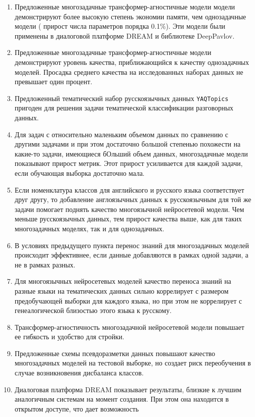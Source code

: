 {}
\begin{enumerate}
\item Предложенные многозадачные трансформер-агностичные модели модели демонстрируют более высокую степень экономии памяти, чем однозадачные модели ( прирост числа параметров порядка 0.1\%). Эти модели были применены в диалоговой платформе DREAM и библиотеке DeepPavlov.
\item Предложенные многозадачные трансформер-агностичные модели демонстрируют уровень качества, приближающийся к качеству однозадачных моделей. Просадка среднего качества на исследованных наборах данных не превышает один процент.
\item Предложенный тематический набор русскоязычных данных \texttt{YAQTopics} пригоден для решения задачи тематической классификации разговорных данных.
\item Для задач с относительно маленьким объемом данных по сравнению с другими задачами и при этом достаточно большой степенью похожести на какие-то задачи, имеющиеся бОльший объем данных, многозадачные модели показывают прирост метрик. Этот прирост усиливается для каждой задачи, если обучающая выборка достаточно мала.
\item Если номенклатура классов для английского и русского языка соответствует друг другу, то добавление англоязычных данных к русскоязычным для той же задачи помогает поднять качество многоязычной нейросетевой модели. Чем меньше русскоязычных данных, тем прирост качества выше, как для таких многозадачных моделях, так и для однозадачных.
\item В условиях предыдущего пункта перенос знаний для многозадачных моделей происходит эффективнее, если данные добавляются в рамках одной задачи, а не в рамках разных.
\item Для многоязычных нейросетевых моделей качество переноса знаний на разные языки на тематических данных сильно коррелирует с размером предобучающей выборки для каждого языка, но при этом не коррелирует с генеалогической близостью этого языка к русскому.
\item Трансформер-агностичность многозадачной нейросетевой модели повышает ее гибкость и удобство для стройки.
\item Предложенные схемы псевдоразметки данных повышают качество многозадачных моделей на тестовой выборке, но создает риск переобучения в случае возникновения дисбаланса классов.

\item Диалоговая платформа DREAM показывает результаты, близкие к лучшим аналогичным системам на момент создания. При этом она находится в открытом доступе, что дает возможность 
\end{enumerate}


